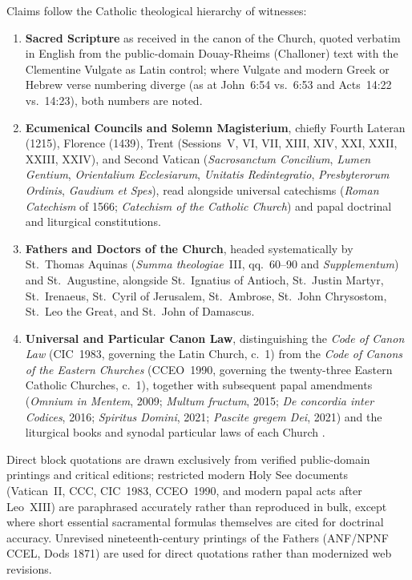 Claims follow the Catholic theological hierarchy of witnesses:
\begin{enumerate}
  \item \textbf{Sacred Scripture} as received in the canon of the Church, quoted verbatim in English from the public-domain Douay-Rheims (Challoner) text with the Clementine Vulgate as Latin control; where Vulgate and modern Greek or Hebrew verse numbering diverge (as at John~6:54 vs.~6:53 and Acts~14:22 vs.~14:23), both numbers are noted.
  \item \textbf{Ecumenical Councils and Solemn Magisterium}, chiefly Fourth Lateran (1215), Florence (1439), Trent (Sessions~V, VI, VII, XIII, XIV, XXI, XXII, XXIII, XXIV), and Second Vatican (\emph{Sacrosanctum Concilium}, \emph{Lumen Gentium}, \emph{Orientalium Ecclesiarum}, \emph{Unitatis Redintegratio}, \emph{Presbyterorum Ordinis}, \emph{Gaudium et Spes}), read alongside universal catechisms (\emph{Roman Catechism} of 1566; \emph{Catechism of the Catholic Church}) and papal doctrinal and liturgical constitutions.
  \item \textbf{Fathers and Doctors of the Church}, headed systematically by St.~Thomas Aquinas (\emph{Summa theologiae}~III, qq.~60--90 and \emph{Supplementum}) and St.~Augustine, alongside St.~Ignatius of Antioch, St.~Justin Martyr, St.~Irenaeus, St.~Cyril of Jerusalem, St.~Ambrose, St.~John Chrysostom, St.~Leo the Great, and St.~John of Damascus.
  \item \textbf{Universal and Particular Canon Law}, distinguishing the \emph{Code of Canon Law} (CIC~1983, governing the Latin Church, c.~1) from the \emph{Code of Canons of the Eastern Churches} (CCEO~1990, governing the twenty-three Eastern Catholic Churches, c.~1), together with subsequent papal amendments (\emph{Omnium in Mentem}, 2009; \emph{Multum fructum}, 2015; \emph{De concordia inter Codices}, 2016; \emph{Spiritus Domini}, 2021; \emph{Pascite gregem Dei}, 2021) and the liturgical books and synodal particular laws of each Church .
\end{enumerate}
Direct block quotations are drawn exclusively from verified public-domain printings and critical editions; restricted modern Holy See documents (Vatican~II, CCC, CIC~1983, CCEO~1990, and modern papal acts after Leo~XIII) are paraphrased accurately rather than reproduced in bulk, except where short essential sacramental formulas themselves are cited for doctrinal accuracy. Unrevised nineteenth-century printings of the Fathers (ANF/NPNF CCEL, Dods 1871) are used for direct quotations rather than modernized web revisions.

